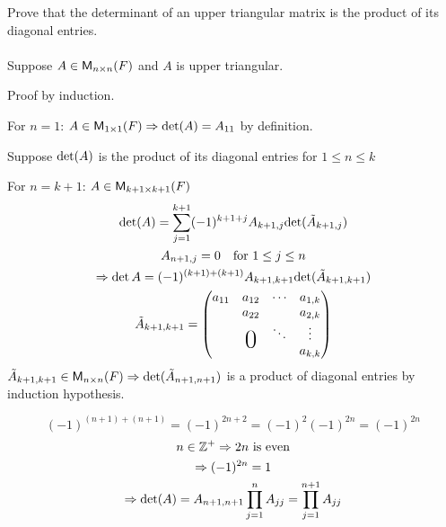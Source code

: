 Prove that the determinant of an upper triangular matrix is the
product of its diagonal entries.
\paragraph{}
Suppose $A \in \mathsf{M}_{n \times n}(F)$ and $A$ is upper triangular.

Proof by induction.

For $n=1$: $A\in \mathsf{M}_{1 \times 1}(F)\Rightarrow \text{det}({A}) = A_{11}$ by definition.

Suppose $\text{det}({A})$ is the product of its diagonal entries for $1\leq
n\leq k$ 

For $n=k+1$: $A \in \mathsf{M}_{k+1 \times k+1}(F)$
\begin{gather}
\dete{A} = \sum\limits_{j=1}^{k+1} (-1)^{k+1+j} A_{k+1,j}
\dete{\tilde{A}_{k+1,j}}\\
A_{n+1,j} = 0 \quad \text{for } 1\leq j\leq n\\
\implies \det{A} = (-1)^{(k+1)+(k+1)}
A_{k+1,k+1}\dete{\tilde{A}_{k+1,k+1}}\\
\tilde{A}_{k+1,k+1} = \begin{pmatrix}
a_{11} & a_{12} & \cdots & a_{1,k}\\
     & a_{22} &        & a_{2,k}\\
      &\bigzero& \ddots & \vdots\\
      &&        & a_{k,k}
\end{pmatrix}
\end{gather}
$\tilde{A}_{k+1,k+1} \in \mathsf{M}_{n \times n}(F) \Rightarrow
\text{det}({\tilde{A}_{n+1,n+1}})$ is a product of diagonal entries by
induction hypothesis.

\begin{equation}
(-1)^{(n+1)+(n+1)} = (-1)^{2n+2} = (-1)^2(-1)^{2n} = (-1)^{2n}
\end{equation}
\begin{gather}
n \in \mathbb{Z}^+ \Rightarrow 2n \text{ is even}\\
\Rightarrow (-1)^{2n} = 1\\
\Rightarrow \text{det}({A}) = A_{n+1,n+1} \prod\limits_{j=1}^n A_{jj} = \prod\limits_{j=1}^{n+1}A_{jj} 
\end{gather}
